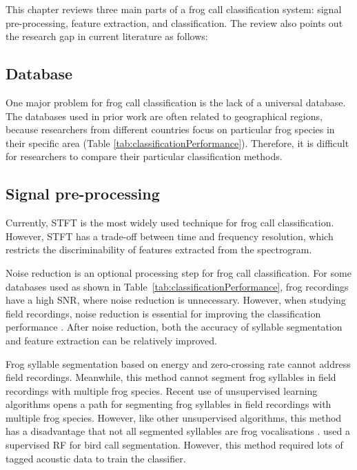 This chapter reviews three main parts of a frog call classification system: signal pre-processing, feature extraction, and classification. The review also points out the research gap in current literature as follows:

\subsection{Database}
One major problem for frog call classification is the lack of a universal database. The databases used in prior work are often related to geographical regions, because researchers from different countries focus on particular frog species in their specific area (Table \ref{tab:classificationPerformance}). Therefore, it is difficult for researchers to compare their particular classification methods. 



\subsection{Signal pre-processing}
Currently, STFT is the most widely used technique for frog call classification. However, STFT has a trade-off between time and frequency resolution, which restricts the discriminability of features extracted from the spectrogram. 

Noise reduction is an optional processing step for frog call classification. For some databases used as shown in Table~\ref{tab:classificationPerformance}, frog recordings have a high SNR, where noise reduction is unnecessary. However, when studying field recordings, noise reduction is essential for improving the classification performance \citep{bedoya2014automatic, Huang20141}. After noise reduction, both the accuracy of syllable segmentation and feature extraction can be relatively improved.

Frog syllable segmentation based on energy and zero-crossing rate cannot address field recordings. Meanwhile, this method cannot segment frog syllables in field recordings with multiple frog species. Recent use of unsupervised learning algorithms opens a path for segmenting frog syllables in field recordings with multiple frog species. However, like other unsupervised algorithms, this method has a disadvantage that not all segmented syllables are frog vocalisations \citep{potamitis2015unsupervised}. \citet{briggs2012acoustic} used a supervised RF for bird call segmentation. However, this method required lots of tagged acoustic data to train the classifier.

